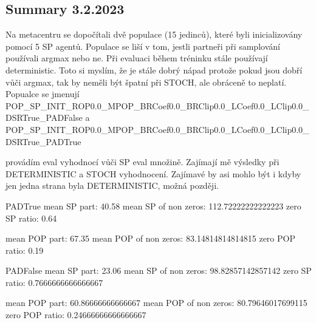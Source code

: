 \documentclass{report}
\begin{document}
\subsection{Summary 3.2.2023}
\begin{list}{}{}
    \item Na metacentru se dopočítali dvě populace (15 jedinců), které byli inicializovány pomocí 5 SP agentů. Populace se liší v tom, jestli partneři při samplování používali argmax nebo ne.
    Při evaluaci během tréninku stále používají deterministic. Toto si myslím, že je stále dobrý nápad protože pokud jsou dobří vůči argmax, tak by neměli být špatní při STOCH, ale obráceně to neplatí.
    Popualce se jmenují POP_SP_INIT_ROP0.0_MPOP_BRCoef0.0_BRClip0.0_LCoef0.0_LClip0.0_DSRTrue_PADFalse a POP_SP_INIT_ROP0.0_MPOP_BRCoef0.0_BRClip0.0_LCoef0.0_LClip0.0_DSRTrue_PADTrue
    \item provádím eval vyhodnocí vůči SP eval množině. Zajímají mě výsledky při DETERMINISTIC a STOCH vyhodnocení. Zajímavé by asi mohlo být i kdyby jen jedna strana byla DETERMINISTIC, možná později.
     
    PADTrue
    mean SP part: 40.58
    mean SP of non zeros: 112.72222222222223
    zero SP ratio: 0.64%

    mean POP part: 67.35
    mean POP of non zeros: 83.14814814814815
    zero POP ratio: 0.19%

    PADFalse
    mean SP part: 23.06
    mean SP of non zeros: 98.82857142857142
    zero SP ratio: 0.7666666666666667%

    mean POP part: 60.86666666666667
    mean POP of non zeros: 80.79646017699115
    zero POP ratio: 0.24666666666666667%

\end{list}
\end{document}

